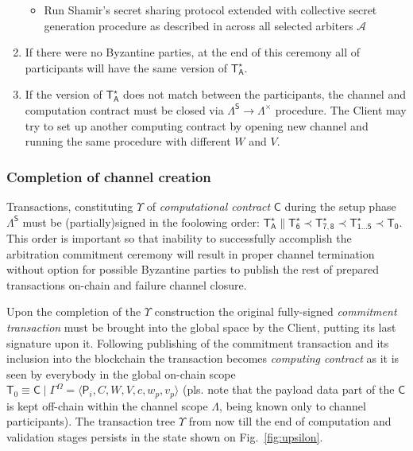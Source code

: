\documentclass[a4paper]{article}
\begin{document}
\begin{enumerate}
\begin{itemize}
        \item Run Shamir's secret sharing protocol extended with collective secret generation procedure as described in \cite{typhon} across all selected arbiters $\mathcal{A}$
    \end{itemize}
    
    \item If there were no Byzantine parties, at the end of this ceremony all of participants will have the same version of $\mathsf{T^\star_A}$. 
    
    \item If the version of $\mathsf{T^\star_A}$ does not match between the participants, the channel and computation contract must be closed via $\Lambda^\mathsf{S} \rightarrow \Lambda^\times$ procedure. The Client may try to set up another computing contract by opening new channel and running the same procedure with different $W$ and $V$.
    
\end{enumerate}

\subsubsection{Completion of channel creation}
Transactions, constituting $\Upsilon$ of \textit{computational contract} $\mathsf{C}$ during the setup phase $\Lambda^\mathsf{S}$ must be (partially)signed in the foolowing order: $\mathsf{T^\star_A} \parallel \mathsf{T^\star_6} \prec \mathsf{T^\star_{7,8}} \prec \mathsf{T^\star_{1\dots 5}} \prec \mathsf{T_0}$. This order is important so that inability to successfully accomplish the arbitration commitment ceremony will result in proper channel termination without option for possible Byzantine parties to publish the rest of prepared transactions on-chain and failure channel closure.

Upon the completion of the $\Upsilon$ construction the original fully-signed \textit{commitment transaction} must be brought into the global space by the Client, putting its last signature upon it. Following publishing of the commitment transaction and its inclusion into the blockchain the transaction becomes \textit{computing contract} as it is seen by everybody in the global on-chain scope $\mathsf{T}_0 \equiv \mathsf{C} \mid \Gamma^\Omega = \langle \mathsf{P}_i, C, W, V, c, w_p, v_p\rangle$ (pls. note that the payload data part of the $\mathsf{C}$ is kept off-chain within the channel scope $\Lambda$, being known only to channel participants). The transaction tree $\Upsilon$ from now till the end of computation and validation stages persists in the state shown on Fig.~\ref{fig:upsilon}.
\end{document}

